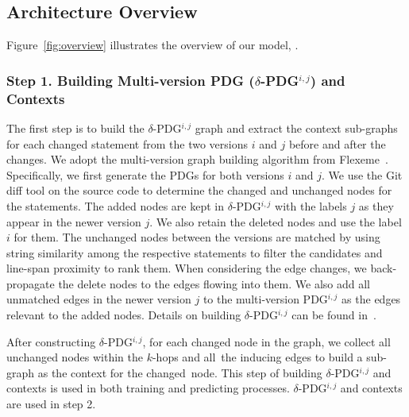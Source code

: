 \subsection{Architecture Overview}
\label{arch-overview:sec}


Figure~\ref{fig:overview} illustrates the overview of our model, {\tool}.

\subsubsection{{\bf Step 1. Building Multi-version PDG ($\delta$-PDG$^{i,j}$) and Contexts}}
The first step is to build the $\delta$-PDG$^{i,j}$ graph and extract
the context sub-graphs for each changed statement from the two
versions $i$ and $j$ before and after the changes. We adopt the
multi-version graph building algorithm from
Flexeme~\cite{flexeme-fse20}. Specifically, we first generate the PDGs
for both versions $i$ and $j$. We use the Git diff tool on the source
code to determine the changed and unchanged nodes for the
statements. The added nodes are kept in $\delta$-PDG$^{i,j}$ with the
labels $j$ as they appear in the newer version $j$. We also retain the
deleted nodes and use the label $i$ for them. The unchanged nodes
between the versions are matched by using string similarity among the
respective statements to filter the candidates and line-span proximity
to rank them. When considering the edge changes, we back-propagate the
delete nodes to the edges flowing into them. We also add all unmatched
edges in the newer version $j$ to the multi-version PDG$^{i,j}$ as the
edges relevant to the added nodes. Details on building
$\delta$-PDG$^{i,j}$ can be found in~\cite{flexeme-fse20}.

After constructing $\delta$-PDG$^{i,j}$, for each changed node in the
graph, we collect all unchanged nodes within the $k$-hops and
all~the inducing edges to build a sub-graph as the context for the
changed~node. 
This step of building $\delta$-PDG$^{i,j}$ and contexts is used in
both training and predicting processes. $\delta$-PDG$^{i,j}$ and contexts are used in step
2.

